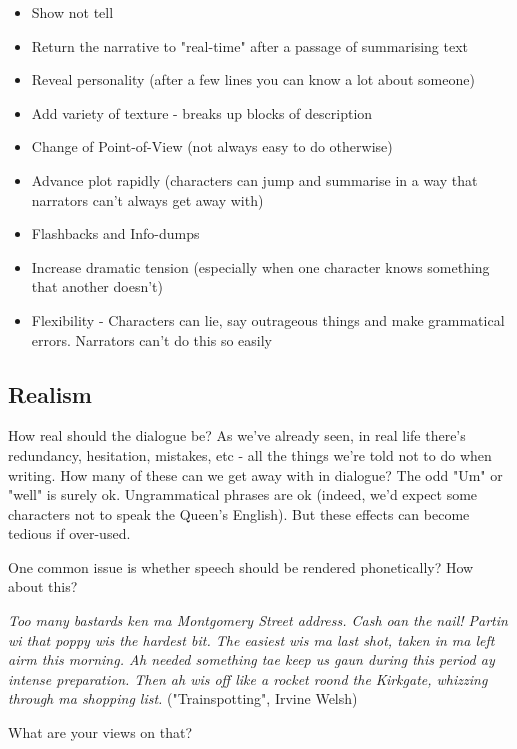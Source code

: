 \documentclass[11pt]{article}
\newenvironment{narrow}[2]{%
 \begin{list}{}{%
  \setlength{\topsep}{0pt}%
  \setlength{\leftmargin}{#1}%
  \setlength{\rightmargin}{#2}%
  \setlength{\listparindent}{\parindent}%
  \setlength{\itemindent}{\parindent}%
  \setlength{\parsep}{\parskip}%
 }%
\item[]}{\end{list}}
\begin{document}
\begin{itemize}
\item Show not tell
\item Return the narrative to "real-time" after a passage of summarising text
\item Reveal personality (after a few lines you can know a lot about someone)
\item Add variety of texture - breaks up blocks of description 
\item Change of Point-of-View (not always easy to do otherwise)
\item Advance plot rapidly (characters can jump and summarise in a way that narrators can't always get away with)
\item Flashbacks and Info-dumps
\item  Increase dramatic tension (especially when one character knows something that another doesn't)
\item Flexibility - Characters can lie, say outrageous things and make grammatical errors. Narrators can't do this so easily

\end{itemize}

\subsection*{Realism}
How real should the dialogue be? As we've already seen, in real life there's redundancy, hesitation, mistakes, etc - all the things we're told not to do when writing. How many of these can we get away with in dialogue? The odd "Um" or "well" is surely ok. Ungrammatical phrases are ok (indeed, we'd expect some characters not to speak the Queen's English). But these effects can become tedious if over-used.



One common issue is whether speech should be rendered phonetically? How about this?

\begin{narrow}{1.0cm}{1.0cm}
 \textit{Too many bastards ken ma Montgomery Street address.  Cash oan the nail! Partin 
wi that poppy wis the hardest bit. The easiest wis ma last shot, taken in ma 
left airm this morning.  Ah needed something tae keep us gaun during this 
period ay intense preparation.  Then ah wis off like a rocket roond the
 Kirkgate, whizzing through ma shopping list.} ("Trainspotting", Irvine Welsh)
\end{narrow}

What are your views on that?
\end{document}
